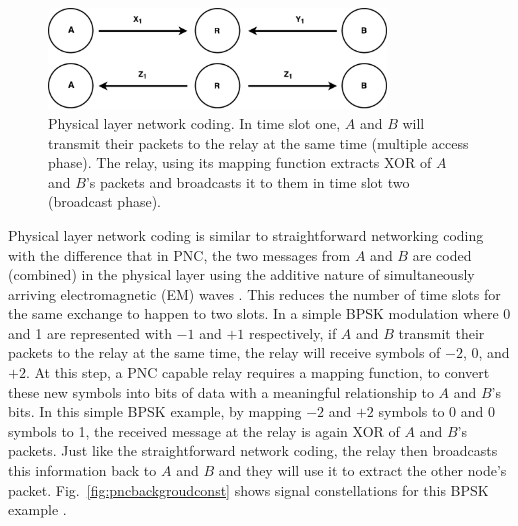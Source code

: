 \begin{figure} [th]
    \centering
    \includegraphics[width=0.8\textwidth]{figures/threeNodePnc.pdf}
    \caption{Physical layer network coding. In time slot one, $A$ and $B$ will transmit their packets to the relay at the same time (multiple access phase). The relay, using its mapping function extracts XOR of $A$ and $B$'s packets and broadcasts it to them in time slot two (broadcast phase).} \label{fig:threeNodePnc}
\end{figure}

Physical layer network coding is similar to straightforward networking coding with the difference that in PNC, the two messages from $A$ and $B$ are coded (combined) in the physical layer using the additive nature of simultaneously arriving electromagnetic (EM) waves \cite{zhang2006hot}. This reduces the number of time slots for the same exchange to happen to two slots. In a simple BPSK modulation where 0 and 1 are represented with $-1$ and $+1$ respectively, if $A$ and $B$ transmit their packets to the relay at the same time, the relay will receive symbols of $-2$, $0$, and $+2$. At this step, a PNC capable relay requires a mapping function, to convert these new symbols into bits of data with a meaningful relationship to $A$ and $B$'s bits. In this simple BPSK example, by mapping $-2$ and $+2$ symbols to 0 and $0$ symbols to 1, the received message at the relay is again XOR of $A$ and $B$'s packets. Just like the straightforward network coding, the relay then broadcasts this information back to $A$ and $B$ and they will use it to extract the other node's packet. Fig.~\ref{fig:pncbackgroudconst} shows signal constellations for this BPSK example \cite{zhang2016design}.

